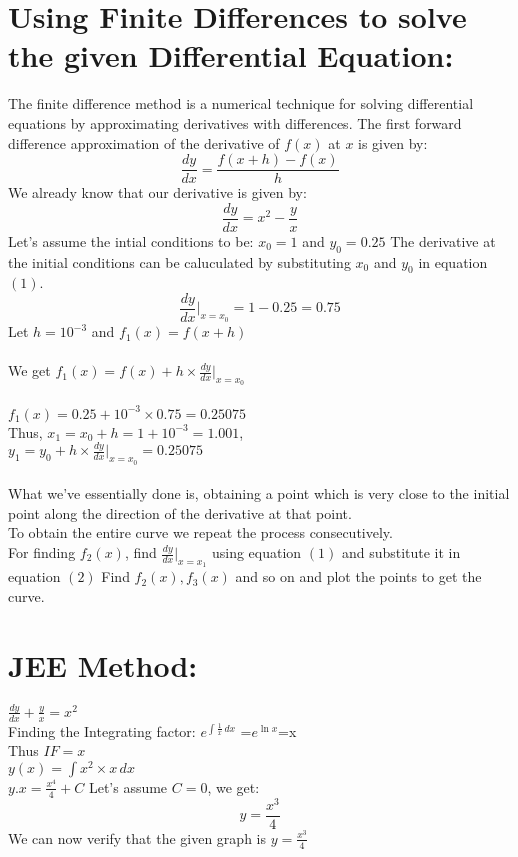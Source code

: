 \documentclass[journal]{IEEEtran}
\begin{document}
\section*{Using Finite Differences to solve the given Differential Equation: }
The finite difference method is a numerical technique for solving differential equations by approximating derivatives with differences.
The first forward difference approximation of the derivative of $f(x)$ at $x$ is given by:
\begin{equation}
    \frac{dy}{dx}=\frac{f(x+h)-f(x)}{h}
\end{equation}
We already know that our derivative is given by:
$$\frac{dy}{dx}=x^2-\frac{y}{x}$$
Let's assume the intial conditions to be: $x_0=1$ and $y_0=0.25$
The derivative at the initial conditions can be caluculated by substituting $x_0$ and $y_0$ in equation $(1)$.\\
$$\frac{dy}{dx}|_{x=x_0}=1-0.25 =0.75$$
Let $h=10^{-3}$ and $f_1(x)=f(x+h)$\\\\
We get $f_1(x)=f(x)+h\times\frac{dy}{dx}|_{x=x_0} $\\\\
$f_1(x)=0.25+10^{-3}\times0.75=0.25075$\\
Thus, $x_1=x_0+h=1+10^{-3}=1.001$,\\$y_1=y_0+h\times\frac{dy}{dx}|_{x=x_0}=0.25075$\\\\
What we've essentially done is, obtaining a point which is very close to the initial point along the direction of the derivative at that point.\\To obtain the entire curve we repeat the process consecutively.\\For finding $f_2(x)$, find $\frac{dy}{dx}|_{x=x_1}$ using equation $(1)$ and substitute it in equation $(2)$ Find $f_2(x), f_3(x)$ and so on and plot the points to get the curve.
\section*{JEE Method:}
$\frac{dy}{dx}+\frac{y}{x}=x^2$\\
Finding the Integrating factor:
$e^{\int \frac{1}{x} \, dx}$ =$e^{\ln{x}}$=x\\
Thus $IF = x$ \\
$y(x)=\int x^2\times x\, dx$\\
$y.x = \frac{x^4}{4}+C$
Let's assume $C=0$, we get:\\
$$y=\frac{x^3}{4}$$
We can now verify that the given graph is $y=\frac{x^3}{4}$
\end{document}

